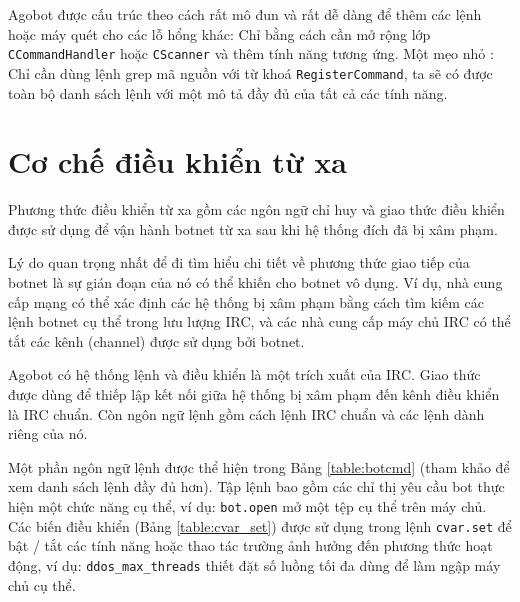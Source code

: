 Agobot được cấu trúc theo cách rất mô đun và rất dễ dàng để thêm các lệnh
hoặc máy quét cho các lỗ hổng khác: Chỉ bằng cách cần mở rộng lớp
\texttt{CCommandHandler} hoặc \texttt{CScanner} và thêm tính năng tương ứng.
Một mẹo nhỏ \cite{honeynetgrep}: Chỉ cần dùng lệnh grep mã nguồn với từ khoá \texttt{RegisterCommand},
ta sẽ có được toàn bộ danh sách lệnh với một mô tả đầy đủ của tất cả các tính năng.

\section{Cơ chế điều khiển từ xa}
Phương thức điều khiển từ xa gồm các ngôn ngữ chỉ huy và giao thức điều khiển được sử dụng
để vận hành botnet từ xa sau khi hệ thống đích đã bị xâm phạm.

Lý do quan trọng nhất để đi tìm hiểu chi tiết về phương thức
giao tiếp của botnet là sự gián đoạn của nó có thể khiến cho botnet vô dụng.
Ví dụ, nhà cung cấp mạng có thể xác định các hệ thống bị xâm phạm bằng cách
tìm kiếm các lệnh botnet cụ thể trong lưu lượng IRC, và các nhà cung cấp
máy chủ IRC có thể tắt các kênh (channel) được sử dụng bởi botnet.

Agobot có hệ thống lệnh và điều khiển là một trích xuất của IRC.
Giao thức được dùng để thiếp lập kết nối giữa hệ thống bị xâm phạm
đến kênh điều khiển là IRC chuẩn. Còn ngôn ngữ lệnh gồm cách lệnh IRC
chuẩn và các lệnh dành riêng của nó.

Một phần ngôn ngữ lệnh được thể hiện trong Bảng \ref{table:botcmd}
(tham khảo \cite{lurhq} để xem danh sách lệnh đầy đủ hơn).
Tập lệnh bao gồm các chỉ thị yêu cầu bot thực hiện một chức năng cụ thể,
ví dụ: \texttt{bot.open} mở một tệp cụ thể trên máy chủ.
Các biến điều khiển (Bảng \ref{table:cvar_set}) được sử dụng trong lệnh \texttt{cvar.set} để bật / tắt
các tính năng hoặc thao tác trường ảnh hưởng đến phương thức hoạt động,
ví dụ: \texttt{ddos\_max\_threads} thiết đặt số luồng tối đa dùng để làm ngập máy
chủ cụ thể.

